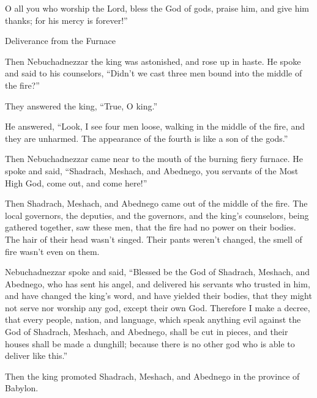 {O all you who worship the Lord, bless the God of gods, praise him, and give him thanks; for his mercy is forever!”
\par }{\SH Deliverance from the Furnace
\par }{\PP {} Then Nebuchadnezzar the king was astonished, and rose up in haste. He spoke and said to his counselors, “Didn’t we cast three men bound into the middle of the fire?”
\par }{\PP They answered the king, “True, O king.”
\par }{\PP {}He answered, “Look, I see four men loose, walking in the middle of the fire, and they are unharmed. The appearance of the fourth is like a son of the gods.”
\par }{\PP {}Then Nebuchadnezzar came near to the mouth of the burning fiery furnace. He spoke and said, “Shadrach, Meshach, and Abednego, you servants of the Most High God, come out, and come here!”
\par }{\PP Then Shadrach, Meshach, and Abednego came out of the middle of the fire.
The local governors, the deputies, and the governors, and the king’s counselors, being gathered together, saw these men, that the fire had no power on their bodies. The hair of their head wasn’t singed. Their pants weren’t changed, the smell of fire wasn’t even on them.
\par }{\PP {}Nebuchadnezzar spoke and said, “Blessed be the God of Shadrach, Meshach, and Abednego, who has sent his angel, and delivered his servants who trusted in him, and have changed the king’s word, and have yielded their bodies, that they might not serve nor worship any god, except their own God.
Therefore I make a decree, that every people, nation, and language, which speak anything evil against the God of Shadrach, Meshach, and Abednego, shall be cut in pieces, and their houses shall be made a dunghill; because there is no other god who is able to deliver like this.”
\par }{\PP {}Then the king promoted Shadrach, Meshach, and Abednego in the province of Babylon.

}
